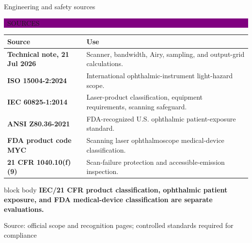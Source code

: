 \documentclass[aspectratio=169,9pt,xcolor=table]{beamer}
\newcommand{\evidence}[2]{%
  \vspace{-0.06cm}\hfill
  \colorbox{#2}{\color{white}\bfseries\scriptsize\strut\ #1\ }\par
  \vspace{0.04cm}
}
\newcommand{\source}[1]{\vfill{\color{Mid}\tiny Source: #1}}
\newcommand{\takeaway}[1]{%
  \begin{beamercolorbox}[rounded=true,sep=0.10cm,wd=\textwidth]{block body}
    \color{Navy}\bfseries #1
  \end{beamercolorbox}
}
\begin{document}
\begin{frame}{Engineering and safety sources}
  \evidence{SOURCES}{Purple}
  \scriptsize
  \renewcommand{\arraystretch}{1.28}
  \begin{tabularx}{\textwidth}{>{\bfseries}p{} X}
    \toprule
    Source & Use\\
    \midrule
    Technical note, 21 Jul 2026 &
      Scanner, bandwidth, Airy, sampling, and output-grid calculations.\\
    ISO 15004-2:2024 &
      International ophthalmic-instrument light-hazard scope.\\
    IEC 60825-1:2014 &
      Laser-product classification, equipment requirements, scanning safeguard.\\
    ANSI Z80.36-2021 &
      FDA-recognized U.S. ophthalmic patient-exposure standard.\\
    FDA product code MYC &
      Scanning laser ophthalmoscope medical-device classification.\\
    21 CFR 1040.10(f)(9) &
      Scan-failure protection and accessible-emission inspection.\\
    \bottomrule
  \end{tabularx}
  \vspace{0.3cm}
  \takeaway{IEC/21 CFR product classification, ophthalmic patient exposure,
    and FDA medical-device classification are separate evaluations.}
  \source{official scope and recognition pages; controlled standards required for compliance}
\end{frame}
\end{document}
